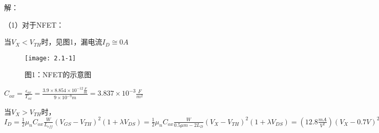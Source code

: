 


\setcounter{tocdepth}{1}                %
\setcounter{secnumdepth}{0}             %

\titleformat{\chapter}{\huge}{}{1em}{}




解：

（1）对于NFET：
	
当$V_X<V_{TH}$时，见图1，漏电流$I_D\cong0A$
	\begin{figure}[H] %
	\centering %
	\begin{minipage}{\linewidth}
		\texttt{[image: 2.1-1]}
	\end{minipage}
	\caption*{图1：NFET的示意图} %
	\label{fig1} %
\end{figure}

$C_{ox}=\frac{\epsilon_{ox}}{T_{ox}}=\frac{3.9 \times 8.854 \times 10^{-12}\frac{F}{m}}{9 \times 10^{-9}m}=3.837 \times 10^{-3}\frac{F}{m^2}$

当$V_X>V_{TH}$时，$I_D=\frac{1}{2}\mu_nC_{ox}\frac{W}{L_{eff}}(V_{GS}-V_{TH})^2(1+\lambda V_{DS})=\frac{1}{2}\mu_nC_{ox}\frac{W}{0.5\mu m-2L_D}(V_{X}-V_{TH})^2(1+\lambda V_{DS})=(12.8\frac{mA}{V^2})(V_X-0.7V)^2$



